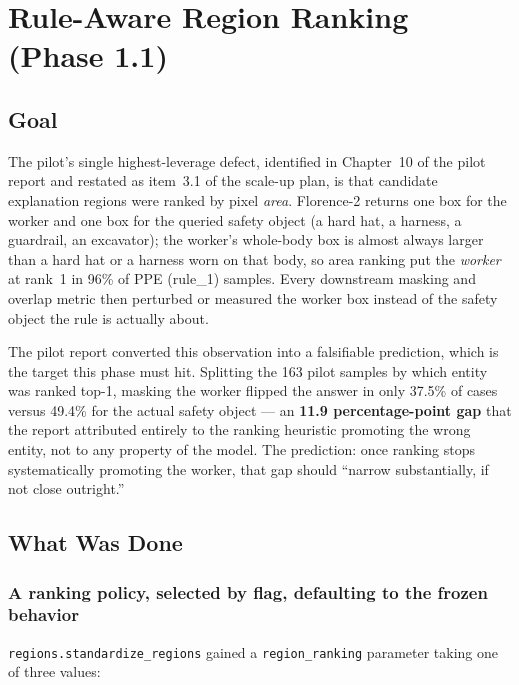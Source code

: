 \chapter{Rule-Aware Region Ranking (Phase 1.1)}
\label{chap:p1-1}

\section{Goal}

The pilot's single highest-leverage defect, identified in Chapter~10 of the pilot report and
restated as item~3.1 of the scale-up plan, is that candidate explanation regions were ranked by
pixel \emph{area}. Florence-2 returns one box for the worker and one box for the queried safety
object (a hard hat, a harness, a guardrail, an excavator); the worker's whole-body box is almost
always larger than a hard hat or a harness worn on that body, so area ranking put the \emph{worker}
at rank~1 in 96\% of PPE (rule\_1) samples. Every downstream masking and overlap metric then
perturbed or measured the worker box instead of the safety object the rule is actually about.

The pilot report converted this observation into a falsifiable prediction, which is the target this
phase must hit. Splitting the 163 pilot samples by which entity was ranked top-1, masking the worker
flipped the answer in only 37.5\% of cases versus 49.4\% for the actual safety object --- an
\textbf{11.9 percentage-point gap} that the report attributed entirely to the ranking heuristic
promoting the wrong entity, not to any property of the model. The prediction: once ranking stops
systematically promoting the worker, that gap should ``narrow substantially, if not close
outright.''

\section{What Was Done}

\subsection{A ranking policy, selected by flag, defaulting to the frozen behavior}

\texttt{regions.standardize\_regions} gained a \texttt{region\_ranking} parameter taking one of three
values:

